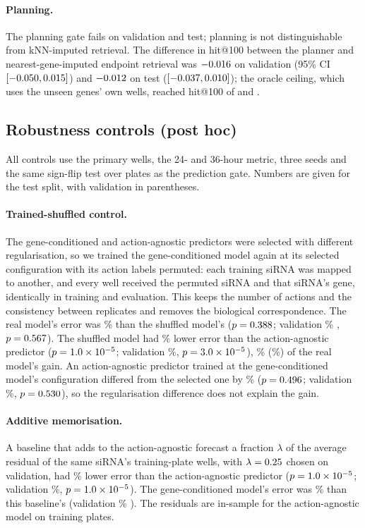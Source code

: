 \paragraph{Planning.} The planning gate fails on validation and test; planning is not
distinguishable from kNN-imputed retrieval. The difference in hit@100 between the planner and
nearest-gene-imputed endpoint retrieval was $-0.016$ on validation (95\% CI
$[-0.050, 0.015]$) and $-0.012$ on test ($[-0.037, 0.010]$); the
oracle ceiling, which uses the unseen genes' own wells, reached hit@100 of \PlanValOracle{} and
\PlanTestOracle.

\subsection{Robustness controls (post hoc)}

All controls use the primary wells, the 24- and 36-hour metric, three seeds and the same
sign-flip test over plates as the prediction gate. Numbers are given for the test split, with
validation in parentheses.

\paragraph{Trained-shuffled control.} The gene-conditioned and action-agnostic predictors were
selected with different regularisation, so we trained the gene-conditioned model again at its
selected configuration with its action labels permuted: each training siRNA was mapped to
another, and every well received the permuted siRNA and that siRNA's gene, identically in
training and evaluation. This keeps the number of actions and the consistency between
replicates and removes the biological correspondence. The real model's error was
\RobOneRelTest\% \RobOneDirTest{} than the shuffled model's ($p=0.388$; validation
\RobOneRelVal\% \RobOneDirVal, $p=0.567$). The shuffled model had \RobShufAgTest\% lower
error than the action-agnostic predictor ($p=1.0\times10^{-5}$; validation \RobShufAgVal\%,
$p=3.0\times10^{-5}$), \RobShufFracTest\% (\RobShufFracVal\%) of the real model's gain. An
action-agnostic predictor trained at the gene-conditioned model's configuration differed from
the selected one by \RobNoneAgTest\% ($p=0.496$; validation \RobNoneAgVal\%,
$p=0.530$), so the regularisation difference does not explain the gain.

\paragraph{Additive memorisation.} A baseline that adds to the action-agnostic forecast a
fraction $\lambda$ of the average residual of the same siRNA's training-plate wells, with
$\lambda=0.25$ chosen on validation, had \RobTwoAgTest\% lower error than the
action-agnostic predictor ($p=1.0\times10^{-5}$; validation \RobTwoAgVal\%, $p=1.0\times10^{-5}$).
The gene-conditioned model's error was \RobTwoRelTest\% \RobTwoDirTest{} than this baseline's
(validation \RobTwoRelVal\% \RobTwoDirVal). The residuals are in-sample for the action-agnostic
model on training plates.

